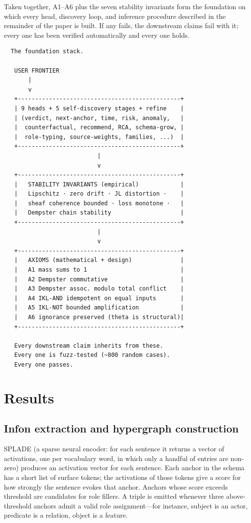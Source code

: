\documentclass[11pt,a4paper]{article}
\begin{document}
\medskip
Taken together, A1--A6 plus the seven stability invariants form
the foundation on which every head, discovery loop, and inference
procedure described in the remainder of the paper is built. If any
fails, the downstream claims fail with it; every one has been
verified automatically and every one holds.

\begin{verbatim}
  The foundation stack.

   USER FRONTIER
       |
       v
   +-----------------------------------------------+
   | 9 heads + 5 self-discovery stages + refine    |
   | (verdict, next-anchor, time, risk, anomaly,   |
   |  counterfactual, recommend, RCA, schema-grow, |
   |  role-typing, source-weights, families, ...)  |
   +-----------------------------------------------+
                           |
                           v
   +-----------------------------------------------+
   |   STABILITY INVARIANTS (empirical)            |
   |   Lipschitz · zero drift · JL distortion ·    |
   |   sheaf coherence bounded · loss monotone ·   |
   |   Dempster chain stability                    |
   +-----------------------------------------------+
                           |
                           v
   +-----------------------------------------------+
   |   AXIOMS (mathematical + design)              |
   |   A1 mass sums to 1                           |
   |   A2 Dempster commutative                     |
   |   A3 Dempster assoc. modulo total conflict    |
   |   A4 IKL-AND idempotent on equal inputs       |
   |   A5 IKL-NOT bounded amplification            |
   |   A6 ignorance preserved (theta is structural)|
   +-----------------------------------------------+

   Every downstream claim inherits from these.
   Every one is fuzz-tested (~800 random cases).
   Every one passes.
\end{verbatim}

\section{Results}

\subsection{Infon extraction and hypergraph construction}

SPLADE (a sparse neural encoder: for each sentence it returns a
vector of activations, one per vocabulary word, in which only a
handful of entries are non-zero) produces an activation vector for
each sentence. Each anchor in the schema has a short list of
surface tokens; the activations of those tokens give a score for
how strongly the sentence evokes that anchor. Anchors whose score
exceeds threshold are candidates for role fillers. A triple is
emitted whenever three above-threshold anchors admit a valid role
assignment---for instance, subject is an actor, predicate is a
relation, object is a feature.
\end{document}

